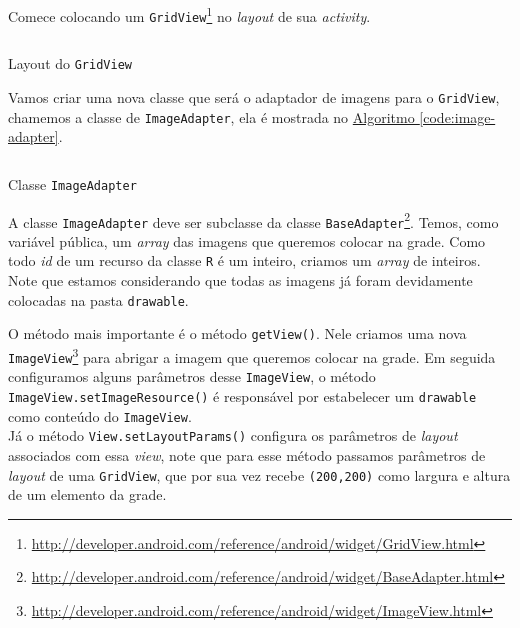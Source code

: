 \documentclass[a4paper,12pt,brazil,oneside]{book}
\begin{document}
\begin{singlespace}
Comece colocando um \texttt{GridView}\footnote{\href{http://developer.android.com/reference/android/widget/GridView.html}{http://developer.android.com/reference/android/widget/GridView.html}} no \emph{layout} de sua \emph{activity}.

\begin{listing}[H]
\inputminted[linenos=true,fontsize=\small,frame=lines, framesep=2mm, tabsize=2,numbersep=5pt]{xml}{src/design/gridview.xml}
\caption{Layout do \texttt{GridView}}
\end{listing}	

Vamos criar uma nova classe que será o adaptador de imagens para o \texttt{GridView}, chamemos a classe de \texttt{ImageAdapter}, ela é mostrada no \hyperref[code:image-adapter]{Algoritmo \ref*{code:image-adapter}}.

\begin{listing}[H]
\inputminted[linenos=true,fontsize=\small,frame=lines, framesep=2mm, tabsize=2,numbersep=5pt]{java}{src/design/imageadapter.java}
\caption{Classe \texttt{ImageAdapter}}
\label{code:image-adapter}
\end{listing}	

A classe \texttt{ImageAdapter} deve ser subclasse da classe \texttt{BaseAdapter}\footnote{\href{http://developer.android.com/reference/android/widget/BaseAdaptfer.html}{http://developer.android.com/reference/android/widget/BaseAdapter.html}}. Temos, como variável pública, um \emph{array} das imagens que queremos colocar na grade. Como todo \emph{id} de um recurso da classe \texttt{R} é um inteiro, criamos um \emph{array} de inteiros. Note que estamos considerando que todas as imagens já foram devidamente colocadas na pasta \texttt{drawable}.

O método mais importante é o método \texttt{getView()}. Nele criamos uma nova \texttt{ImageView}\footnote{\href{http://developer.android.com/reference/android/widget/ImageView.html}{http://developer.android.com/reference/android/widget/ImageView.html}} para abrigar a imagem que queremos colocar na grade. Em seguida configuramos alguns parâmetros desse \texttt{ImageView}, o método \texttt{ImageView.setImageResource()} é responsável por estabelecer um \texttt{drawable} como conteúdo do \texttt{ImageView}. \\ Já o método \texttt{View.setLayoutParams()} configura os parâmetros de \emph{layout} associados com essa \emph{view}, note que para esse método passamos parâmetros de \emph{layout} de uma \texttt{GridView}, que por sua vez recebe \texttt{(200,200)} como largura e altura de um elemento da grade.


\end{singlespace}
\end{document}
